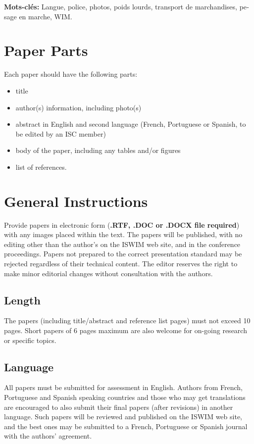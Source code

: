 \documentclass[a4paper]{article}
\newcommand\textstyletablecaptionCar[1]{\foreignlanguage{english}{\textbf{#1}}}
\newcommand\liststyleWWNumvi{%
\renewcommand\theenumi{\arabic{enumi}}
\renewcommand\theenumii{\arabic{enumii}}
\renewcommand\theenumiii{\arabic{enumiii}}
\renewcommand\labelitemi{[F0B7?]}
\renewcommand\labelenumi{\theenumi.}
\renewcommand\labelenumii{\theenumii.}
\renewcommand\labelenumiii{\theenumiii.}
}
\begin{document}
\bigskip

{
\textstyletablecaptionCar{\foreignlanguage{french}{Mots-clés:}}\foreignlanguage{french}{
Langue, police, photos, poids lourds, transport de marchandises, pesage
en marche, WIM.}}

\section{Paper Parts}
{
Each paper should have the following parts:}

\liststyleWWNumvi
\begin{itemize}
\item {
title}
\item {
author(s) information, including photo(s)}
\item {
abstract in English and second language (French, Portuguese or Spanish,
to be edited by an ISC member)}
\item {
body of the paper, including any tables and/or figures}
\item {
list of references.}
\end{itemize}
\section{General Instructions}
{
Provide papers in electronic form (\textbf{.RTF, .DOC or .DOCX file
required}) with any images placed within the text. The papers will be
published, with no editing other than the author’s on the ISWIM web
site, and in the conference proceedings. Papers not prepared to the
correct presentation standard may be rejected regardless of their
technical content. The editor reserves the right to make minor
editorial changes without consultation with the authors.}

\subsection{Length}
{
The papers (including title/abstract and reference list pages) must not
exceed 10 pages. Short papers of 6 pages maximum are also welcome for
on-going research or specific topics.}

\subsection{Language }
{
All papers must be submitted for assessment in English. Authors from
French, Portuguese and Spanish speaking countries and those who may get
translations are encouraged to also submit their final papers (after
revisions) in another language. Such papers will be reviewed and
published on the ISWIM web site, and the best ones may be submitted to
a French, Portuguese or Spanish journal with the authors’ agreement.}
\end{document}
